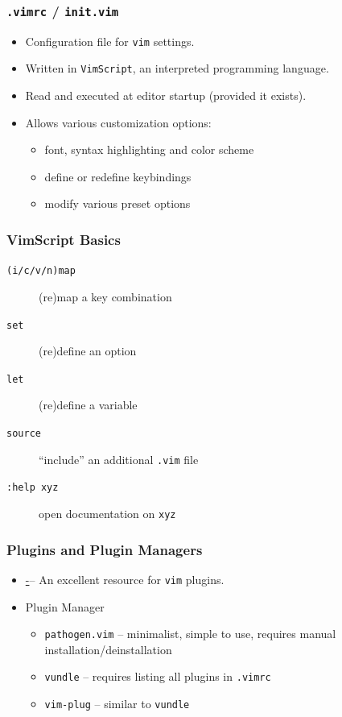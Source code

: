 \documentclass{beamer}
\begin{document}
\begin{frame}
    \frametitle{\texttt{.vimrc} / \texttt{init.vim}}
    \begin{itemize}
        \item Configuration file for \texttt{vim} settings.
        \item Written in \texttt{VimScript}, an interpreted programming language.
        \item Read and executed at editor startup (provided it exists).
        \item Allows various customization options:
        \begin{itemize}
            \item font, syntax highlighting and color scheme
            \item define or redefine keybindings
            \item modify various preset options
        \end{itemize}
    \end{itemize}
\end{frame}
\begin{frame}
    \frametitle{VimScript Basics}
    \begin{description}
        \item [\texttt{(i/c/v/n)map}] (re)map a key combination
        \item [\texttt{set}] (re)define an option
        \item [\texttt{let}] (re)define a variable
        \item [\texttt{source}] ``include'' an additional \texttt{.vim} file
        \item [\texttt{:help xyz}] open documentation on \texttt{xyz}
    \end{description}
\end{frame}
\begin{frame}
    \frametitle{Plugins and Plugin Managers}
    \begin{itemize}
        \item \href{http://vimawesome.com/} --- An excellent resource for \texttt{vim} plugins.
        \item Plugin Manager
        \begin{itemize}
            \item \texttt{pathogen.vim} -- minimalist, simple to use, requires manual installation/deinstallation
            \item \texttt{vundle} -- requires listing all plugins in \texttt{.vimrc}
            \item \texttt{vim-plug} -- similar to \texttt{vundle}
        \end{itemize}
    \end{itemize}
\end{frame}
\end{document}
